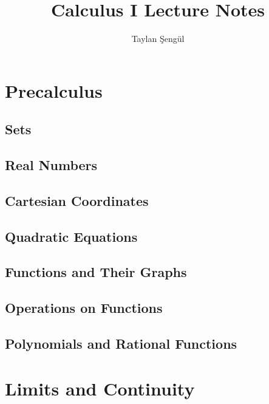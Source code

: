 \documentclass[12pt]{memoir}
\title{Calculus I Lecture Notes}
\author{Taylan Şengül}
\begin{document}
\maketitle
\tableofcontents
\chapter{Precalculus}
    \section{Sets}
    
    \section{Real Numbers}
    
    \section{Cartesian Coordinates}
    
    \section{Quadratic Equations}
    
    \section{Functions and Their Graphs}
    
    \section{Operations on Functions}
    
    \section{Polynomials and Rational Functions}
    


\chapter{Limits and Continuity}
\end{document}
